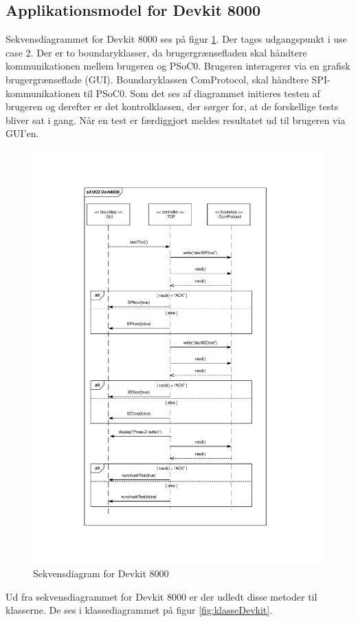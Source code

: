 \subsection{Applikationsmodel for Devkit 8000}
Sekvensdiagrammet for Devkit 8000 ses på figur \ref{fig:sekvensDevkit}. Der tages udgangspunkt i use case 2. Der er to boundaryklasser, da brugergrænsefladen skal håndtere kommunikationen mellem brugeren og PSoC0. Brugeren interagerer via en grafisk brugergrænseflade (GUI). Boundaryklassen ComProtocol, skal håndtere SPI-kommunikationen til PSoC0. Som det ses af diagrammet initieres testen af brugeren og derefter er det kontrolklassen, der sørger for, at de forskellige tests bliver sat i gang. Når en test er færdiggjort meldes resultatet ud til brugeren via GUI'en.

\begin{figure}[H]
	\centering
	\includegraphics[trim = {3.6cm 2.7cm 4cm 2.7cm}, clip = true, width=\textwidth] {Systemarkitektur/images/SekvensdiagramDevkit.pdf}
	\caption{Sekvensdiagram for Devkit 8000}
	\label{fig:sekvensDevkit}
\end{figure}
Ud fra sekvensdiagrammet for Devkit 8000 er der udledt disse metoder til klasserne. De ses i klassediagrammet på figur \ref{fig:klasseDevkit}. 

